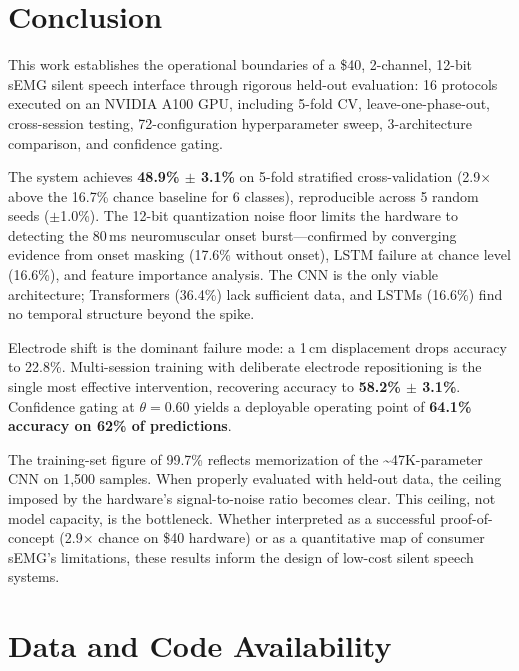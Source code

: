 \documentclass[11pt, a4paper]{article}
\begin{document}
\section{Conclusion}
\label{sec:conclusion}

This work establishes the operational boundaries of a \$40, 2-channel, 12-bit sEMG silent speech interface through rigorous held-out evaluation: 16 protocols executed on an NVIDIA A100 GPU, including 5-fold CV, leave-one-phase-out, cross-session testing, 72-configuration hyperparameter sweep, 3-architecture comparison, and confidence gating.

The system achieves \textbf{48.9\% $\pm$ 3.1\%} on 5-fold stratified cross-validation (2.9$\times$ above the 16.7\% chance baseline for 6 classes), reproducible across 5 random seeds ($\pm$1.0\%). The 12-bit quantization noise floor limits the hardware to detecting the 80\,ms neuromuscular onset burst---confirmed by converging evidence from onset masking (17.6\% without onset), LSTM failure at chance level (16.6\%), and feature importance analysis. The CNN is the only viable architecture; Transformers (36.4\%) lack sufficient data, and LSTMs (16.6\%) find no temporal structure beyond the spike.

Electrode shift is the dominant failure mode: a 1\,cm displacement drops accuracy to 22.8\%. Multi-session training with deliberate electrode repositioning is the single most effective intervention, recovering accuracy to \textbf{58.2\% $\pm$ 3.1\%}. Confidence gating at $\theta = 0.60$ yields a deployable operating point of \textbf{64.1\% accuracy on 62\% of predictions}.

The training-set figure of 99.7\% reflects memorization of the \textasciitilde47K-parameter CNN on 1,500 samples. When properly evaluated with held-out data, the ceiling imposed by the hardware's signal-to-noise ratio becomes clear. This ceiling, not model capacity, is the bottleneck. Whether interpreted as a successful proof-of-concept (2.9$\times$ chance on \$40 hardware) or as a quantitative map of consumer sEMG's limitations, these results inform the design of low-cost silent speech systems.

\section*{Data and Code Availability}
\end{document}
